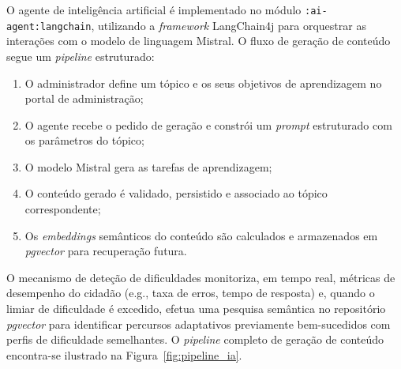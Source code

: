 O agente de inteligência artificial é implementado no módulo \texttt{:ai-agent:langchain}, utilizando a \textit{framework} LangChain4j para orquestrar as interações com o modelo de linguagem Mistral. O fluxo de geração de conteúdo segue um \textit{pipeline} estruturado:

\begin{enumerate}
  \item O administrador define um tópico e os seus objetivos de aprendizagem no portal de administração;
  \item O agente recebe o pedido de geração e constrói um \textit{prompt} estruturado com os parâmetros do tópico;
  \item O modelo Mistral gera as tarefas de aprendizagem;
  \item O conteúdo gerado é validado, persistido e associado ao tópico correspondente;
  \item Os \textit{embeddings} semânticos do conteúdo são calculados e armazenados em \textit{pgvector} para recuperação futura.
\end{enumerate}

O mecanismo de deteção de dificuldades monitoriza, em tempo real, métricas de desempenho do cidadão (e.g., taxa de erros, tempo de resposta) e, quando o limiar de dificuldade é excedido, efetua uma pesquisa semântica no repositório \textit{pgvector} para identificar percursos adaptativos previamente bem-sucedidos com perfis de dificuldade semelhantes. O \textit{pipeline} completo de geração de conteúdo encontra-se ilustrado na Figura~\ref{fig:pipeline_ia}.

